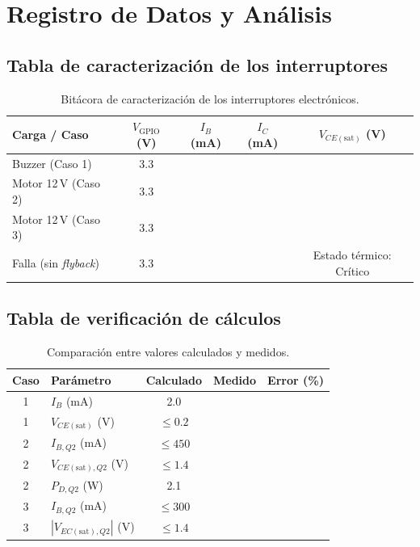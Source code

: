 \documentclass[11pt]{article}
\begin{document}
\section{Registro de Datos y Análisis}

\subsection{Tabla de caracterización de los interruptores}
\begin{table}[H]\centering
\caption{Bitácora de caracterización de los interruptores electrónicos.}
\begin{tabular}{lcccc}
\toprule
Carga / Caso & $V_\text{GPIO}$ (V) & $I_B$ (mA) & $I_C$ (mA) & $V_{CE(\text{sat})}$ (V) \\
\midrule
Buzzer (Caso 1) & 3.3 & & & \\
Motor 12\,V (Caso 2) & 3.3 & & & \\
Motor 12\,V (Caso 3) & 3.3 & & & \\
Falla (sin \emph{flyback}) & 3.3 & & & Estado térmico: Crítico \\
\bottomrule
\end{tabular}
\end{table}

\subsection{Tabla de verificación de cálculos}
\begin{table}[H]\centering
\caption{Comparación entre valores calculados y medidos.}
\begin{tabular}{clccc}
\toprule
Caso & Parámetro & Calculado & Medido & Error (\%) \\
\midrule
1 & $I_B$ (mA) & 2.0 & & \\
1 & $V_{CE(\text{sat})}$ (V) & $\le 0.2$ & & \\
2 & $I_{B,Q2}$ (mA) & $\le 450$ & & \\
2 & $V_{CE(\text{sat}),Q2}$ (V) & $\le 1.4$ & & \\
2 & $P_{D,Q2}$ (W) & 2.1 & & \\
3 & $I_{B,Q2}$ (mA) & $\le 300$ & & \\
3 & $|V_{EC(\text{sat}),Q2}|$ (V) & $\le 1.4$ & & \\
\bottomrule
\end{tabular}
\end{table}
\end{document}
